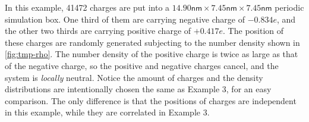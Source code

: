 \documentclass[journal=jacsat,manuscript=article]{achemso}
\renewcommand{\v}[1]{\textbf{\textit{#1}}}
\begin{document}
In this example,  41472 charges are put into a
$14.90\textsf{nm}\times 7.45\textsf{nm}\times 7.45\textsf{nm}$
periodic simulation box. One third of
them are carrying negative charge of $-0.834e$, and the other two thirds
are carrying positive charge of $+0.417e$.
The position of these charges
are randomly generated subjecting to the number density shown in
\ref{fig:tmp-rho}.  The number density of the  positive
charge   is twice as large as that of the negative charge,
so the
positive and negative charges cancel, and the
system is \emph{locally} neutral. Notice the amount of charges
and the density distributions are intentionally chosen the same as
Example 3,
for an easy comparison.  The only difference is that the positions
of charges are independent  in this example,
while they are correlated in Example 3.

\end{document}
